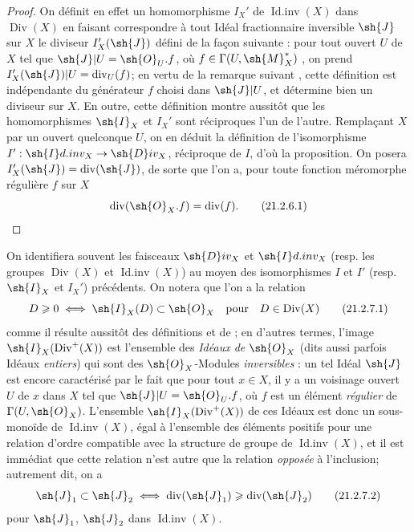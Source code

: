 \begin{proof}
On définit en effet un homomorphisme $I_X'$ de $\operatorname{Id.inv}(X)$ dans $\operatorname{Div}(X)$ en faisant correspondre à tout Idéal fractionnaire inversible $\sh{J}$ sur $X$ le diviseur $I_X'(\sh{J})$ défini de la façon suivante : pour tout ouvert $U$ de $X$ tel que $\sh{J}|U=\sh{O}_U.f$, où $f\in\Gamma(U,\sh{M}_X^*)$ , on prend $I_X'(\sh{J})|U=\operatorname{div}_U(f)$;
en vertu de la remarque suivant , cette définition est indépendante du générateur $f$ choisi dans $\sh{J}|U$, et détermine bien un diviseur sur $X$.
En outre, cette définition montre aussitôt que les homomorphismes $\sh{I}_X$ et $I_X'$ sont réciproques l'un de l'autre.
Remplaçant $X$ par un ouvert quelconque $U$, on en déduit la définition de l'isomorphisme $I':\sh{I}d.inv_X\to\sh{D}iv_X$, réciproque de $I$, d'où la proposition.
On posera $I_X'(\sh{J})=\operatorname{div}(\sh{J})$, de sorte que l'on a, pour toute fonction méromorphe régulière $f$ sur $X$
\[
\label{IV.21.2.6.1}
  \operatorname{div}(\sh{O}_X.f)=\operatorname{div}(f).
  \tag{21.2.6.1}
\]
\end{proof}

\begin{env}[21.2.7]
On identifiera souvent les faisceaux $\sh{D}iv_X$ et $\sh{I}d.inv_X$ (resp. les groupes $\operatorname{Div}(X)$ et $\operatorname{Id.inv}(X)$) au moyen des isomorphismes $I$ et $I'$ (resp. $\sh{I}_X$ et $I_X'$) précédents.
On notera que l'on a la relation
\[
\label{IV.21.2.7.1}
  D\geq0 \iff \sh{I}_X(D)\subset\sh{O}_X \quad\text{pour}\quad D\in\operatorname{Div}(X)
  \tag{21.2.7.1}
\]
comme il résulte aussitôt des définitions  et de ;
en d'autres termes, l'image $\sh{I}_X(\operatorname{Div}^+(X))$ est l'ensemble des \emph{Idéaux de} $\sh{O}_X$ (dits aussi parfois Idéaux \emph{entiers}) qui sont des $\sh{O}_X$-Modules \emph{inversibles} : un tel Idéal $\sh{J}$ est encore caractérisé par le fait que pour tout $x\in X$, il y a un voisinage ouvert $U$ de $x$ dans $X$ tel que $\sh{J}|U=\sh{O}_U.f$, où $f$ est un élément \emph{régulier} de $\Gamma(U,\sh{O}_X)$.
L'ensemble $\sh{I}_X(\operatorname{Div}^+(X))$ de ces Idéaux est donc un sous-monoïde de $\operatorname{Id.inv}(X)$, égal à l'ensemble des éléments positifs pour une relation d'ordre compatible avec la structure de groupe de $\operatorname{Id.inv}(X)$, et il est immédiat que cette relation n'est autre que la relation \emph{opposée} à l'inclusion;
autrement dit, on a
\[
\label{IV.21.2.7.2}
  \sh{J}_1\subset\sh{J}_2 \iff \operatorname{div}(\sh{J}_1)\geq\operatorname{div}(\sh{J}_2)
  \tag{21.2.7.2}
\]
pour $\sh{J}_1$, $\sh{J}_2$ dans $\operatorname{Id.inv}(X)$.
\end{env}

